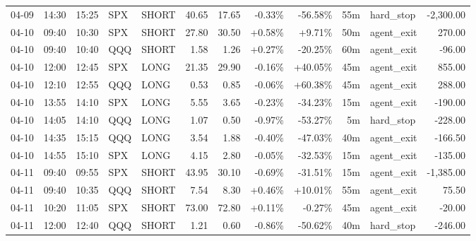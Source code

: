 \documentclass[11pt,a4paper,twoside]{article}
\begin{document}
\begin{center}
\begin{longtable}{>{\color{txtmain}}l l l l l r r r r r >{\color{txtmain}}l r}
04-09 & 14:30 & 15:25 & SPX & SHORT & 40.65 & 17.65 & \textcolor{lossred}{-0.33\%} & \textcolor{lossred}{-56.58\%} & 55m & hard\_stop & \textcolor{lossred}{-2,300.00} \\
04-10 & 09:40 & 10:30 & SPX & SHORT & 27.80 & 30.50 & \textcolor{wingreen}{+0.58\%} & \textcolor{wingreen}{+9.71\%} & 50m & agent\_exit & \textcolor{wingreen}{270.00} \\
04-10 & 09:40 & 10:40 & QQQ & SHORT & 1.58 & 1.26 & \textcolor{wingreen}{+0.27\%} & \textcolor{lossred}{-20.25\%} & 60m & agent\_exit & \textcolor{lossred}{-96.00} \\
04-10 & 12:00 & 12:45 & SPX & LONG & 21.35 & 29.90 & \textcolor{lossred}{-0.16\%} & \textcolor{wingreen}{+40.05\%} & 45m & agent\_exit & \textcolor{wingreen}{855.00} \\
04-10 & 12:10 & 12:55 & QQQ & LONG & 0.53 & 0.85 & \textcolor{lossred}{-0.06\%} & \textcolor{wingreen}{+60.38\%} & 45m & agent\_exit & \textcolor{wingreen}{288.00} \\
04-10 & 13:55 & 14:10 & SPX & LONG & 5.55 & 3.65 & \textcolor{lossred}{-0.23\%} & \textcolor{lossred}{-34.23\%} & 15m & agent\_exit & \textcolor{lossred}{-190.00} \\
04-10 & 14:05 & 14:10 & QQQ & LONG & 1.07 & 0.50 & \textcolor{lossred}{-0.97\%} & \textcolor{lossred}{-53.27\%} & 5m & hard\_stop & \textcolor{lossred}{-228.00} \\
04-10 & 14:35 & 15:15 & QQQ & LONG & 3.54 & 1.88 & \textcolor{lossred}{-0.40\%} & \textcolor{lossred}{-47.03\%} & 40m & agent\_exit & \textcolor{lossred}{-166.50} \\
04-10 & 14:55 & 15:10 & SPX & LONG & 4.15 & 2.80 & \textcolor{lossred}{-0.05\%} & \textcolor{lossred}{-32.53\%} & 15m & agent\_exit & \textcolor{lossred}{-135.00} \\
04-11 & 09:40 & 09:55 & SPX & SHORT & 43.95 & 30.10 & \textcolor{lossred}{-0.69\%} & \textcolor{lossred}{-31.51\%} & 15m & agent\_exit & \textcolor{lossred}{-1,385.00} \\
04-11 & 09:40 & 10:35 & QQQ & SHORT & 7.54 & 8.30 & \textcolor{wingreen}{+0.46\%} & \textcolor{wingreen}{+10.01\%} & 55m & agent\_exit & \textcolor{wingreen}{75.50} \\
04-11 & 10:20 & 11:05 & SPX & SHORT & 73.00 & 72.80 & \textcolor{wingreen}{+0.11\%} & \textcolor{lossred}{-0.27\%} & 45m & agent\_exit & \textcolor{lossred}{-20.00} \\
04-11 & 12:00 & 12:40 & QQQ & SHORT & 1.21 & 0.60 & \textcolor{lossred}{-0.86\%} & \textcolor{lossred}{-50.62\%} & 40m & hard\_stop & \textcolor{lossred}{-246.00} \\

\end{longtable}
\end{center}
\end{document}
